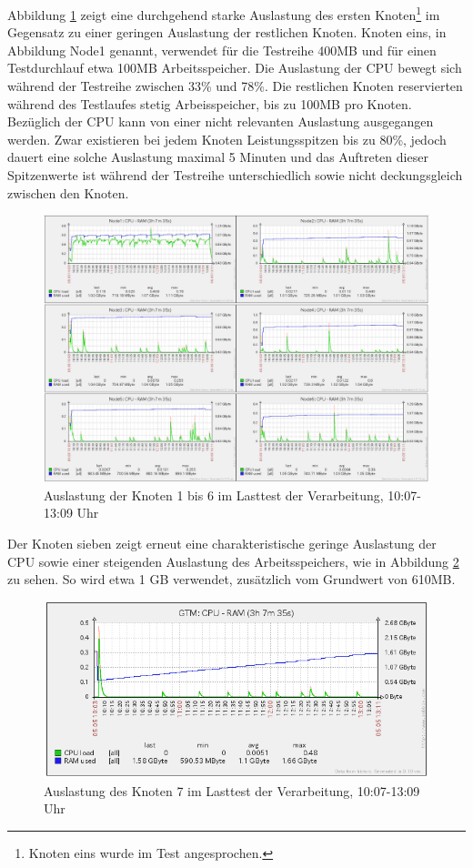 Abbildung \ref{fig:auslastungTest2} zeigt eine durchgehend starke Auslastung des ersten Knoten\footnote{Knoten eins wurde im Test angesprochen.} im Gegensatz zu einer geringen Auslastung der restlichen Knoten.
Knoten eins, in Abbildung Node1 genannt, verwendet für die Testreihe 400MB und für einen Testdurchlauf etwa 100MB Arbeitsspeicher.
Die Auslastung der CPU bewegt sich während der Testreihe zwischen 33\%{} und 78\%{}.
Die restlichen Knoten reservierten während des Testlaufes stetig Arbeisspeicher, bis zu 100MB pro Knoten.
Bezüglich der CPU kann von einer nicht relevanten Auslastung ausgegangen werden.
Zwar existieren bei jedem Knoten Leistungsspitzen bis zu 80\%{}, jedoch dauert eine solche Auslastung maximal 5 Minuten und das Auftreten dieser Spitzenwerte ist während der Testreihe unterschiedlich sowie nicht deckungsgleich zwischen den Knoten.
\begin{figure}[h!]
\centering
\includegraphics[width=\textwidth]{Testergebnisse/jdbc_contouring_Testlauf.png}
\caption[Auslastung der Knoten 1 bis 6 im Lasttest der Verarbeitung]{Auslastung der Knoten 1 bis 6 im Lasttest der Verarbeitung, 10:07-13:09 Uhr}
\label{fig:auslastungTest2}
\end{figure}
Der Knoten sieben zeigt erneut eine charakteristische geringe Auslastung der CPU sowie einer steigenden Auslastung des Arbeitsspeichers, wie in Abbildung \ref{fig:auslastungTest2_gtm} zu sehen.
So wird etwa 1 GB verwendet, zusätzlich vom Grundwert von 610MB.
\begin{figure}[h!]
\centering
\includegraphics[width=\textwidth]{Testergebnisse/jdbc_contouring_Testlauf_bild2.png}
\caption[Auslastung des Knoten 7 im Lasttest der Verarbeitung]{Auslastung des Knoten 7 im Lasttest der Verarbeitung, 10:07-13:09 Uhr}
\label{fig:auslastungTest2_gtm}
\end{figure}


